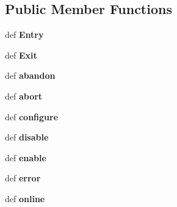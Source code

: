 \subsection*{Public Member Functions}
\begin{DoxyCompactItemize}
\item 
\hypertarget{classlifecycle__sm_1_1sal_lifecycle_state_a3606769c3d0f73e716ec073de511242c}{def {\bfseries Entry}}\label{classlifecycle__sm_1_1sal_lifecycle_state_a3606769c3d0f73e716ec073de511242c}

\item 
\hypertarget{classlifecycle__sm_1_1sal_lifecycle_state_acc02f7c886378176cc072aaa6142a214}{def {\bfseries Exit}}\label{classlifecycle__sm_1_1sal_lifecycle_state_acc02f7c886378176cc072aaa6142a214}

\item 
\hypertarget{classlifecycle__sm_1_1sal_lifecycle_state_a63a2bc3242f40b93a6e52fc347b9fc2b}{def {\bfseries abandon}}\label{classlifecycle__sm_1_1sal_lifecycle_state_a63a2bc3242f40b93a6e52fc347b9fc2b}

\item 
\hypertarget{classlifecycle__sm_1_1sal_lifecycle_state_ac503f4ff9264088080e72082c27c6825}{def {\bfseries abort}}\label{classlifecycle__sm_1_1sal_lifecycle_state_ac503f4ff9264088080e72082c27c6825}

\item 
\hypertarget{classlifecycle__sm_1_1sal_lifecycle_state_a7aec95278fbf73930937d062a36fd2c4}{def {\bfseries configure}}\label{classlifecycle__sm_1_1sal_lifecycle_state_a7aec95278fbf73930937d062a36fd2c4}

\item 
\hypertarget{classlifecycle__sm_1_1sal_lifecycle_state_a535291ec24ee72018a5d232e0e36bac6}{def {\bfseries disable}}\label{classlifecycle__sm_1_1sal_lifecycle_state_a535291ec24ee72018a5d232e0e36bac6}

\item 
\hypertarget{classlifecycle__sm_1_1sal_lifecycle_state_aeaf52117bd30c00dd29019b8468929f7}{def {\bfseries enable}}\label{classlifecycle__sm_1_1sal_lifecycle_state_aeaf52117bd30c00dd29019b8468929f7}

\item 
\hypertarget{classlifecycle__sm_1_1sal_lifecycle_state_a91b31fa050b778bbe2c7463dd084398b}{def {\bfseries error}}\label{classlifecycle__sm_1_1sal_lifecycle_state_a91b31fa050b778bbe2c7463dd084398b}

\item 
\hypertarget{classlifecycle__sm_1_1sal_lifecycle_state_af62532e69229db6aaf086b6ab3f1e4ed}{def {\bfseries online}}\label{classlifecycle__sm_1_1sal_lifecycle_state_af62532e69229db6aaf086b6ab3f1e4ed}


\end{DoxyCompactItemize}
